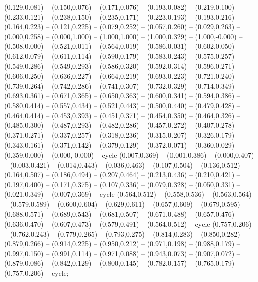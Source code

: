{			(0.129,0.081) -- (0.150,0.076) -- (0.171,0.076) -- (0.193,0.082) --
			(0.219,0.100) -- (0.233,0.121) -- (0.238,0.150) -- (0.235,0.171) --
			(0.223,0.193) -- (0.193,0.216) -- (0.164,0.223) -- (0.121,0.225) --
			(0.079,0.252) -- (0.057,0.260) -- (0.029,0.263) -- (0.000,0.258) --
			(0.000,1.000) -- (1.000,1.000) -- (1.000,0.329) -- (1.000,-0.000) --
			(0.508,0.000) -- (0.521,0.011) -- (0.564,0.019) -- (0.586,0.031) --
			(0.602,0.050) -- (0.612,0.079) -- (0.611,0.114) -- (0.590,0.179) --
			(0.583,0.243) -- (0.575,0.257) -- (0.549,0.286) -- (0.549,0.293) --
			(0.586,0.320) -- (0.592,0.314) -- (0.596,0.271) -- (0.606,0.250) --
			(0.636,0.227) -- (0.664,0.219) -- (0.693,0.223) -- (0.721,0.240) --
			(0.739,0.264) -- (0.742,0.286) -- (0.741,0.307) -- (0.732,0.329) --
			(0.714,0.349) -- (0.693,0.361) -- (0.671,0.365) -- (0.650,0.363) --
			(0.600,0.341) -- (0.594,0.386) -- (0.580,0.414) -- (0.557,0.434) --
			(0.521,0.443) -- (0.500,0.440) -- (0.479,0.428) -- (0.464,0.414) --
			(0.453,0.393) -- (0.451,0.371) -- (0.454,0.350) -- (0.464,0.326) --
			(0.485,0.300) -- (0.487,0.293) -- (0.482,0.286) -- (0.457,0.272) --
			(0.407,0.278) -- (0.371,0.271) -- (0.337,0.257) -- (0.318,0.236) --
			(0.315,0.207) -- (0.326,0.179) -- (0.343,0.161) -- (0.371,0.142) --
			(0.379,0.129) -- (0.372,0.071) -- (0.360,0.029) -- (0.359,0.000) --
			(0.000,-0.000) -- cycle
		(0.007,0.369) -- (0.001,0.386) -- (0.000,0.407) -- (0.003,0.421) --
			(0.014,0.443) -- (0.036,0.463) -- (0.107,0.504) -- (0.136,0.512) --
			(0.164,0.507) -- (0.186,0.494) -- (0.207,0.464) -- (0.213,0.436) --
			(0.210,0.421) -- (0.197,0.400) -- (0.171,0.375) -- (0.107,0.336) --
			(0.079,0.328) -- (0.050,0.331) -- (0.021,0.349) -- (0.007,0.369) -- cycle
		(0.564,0.512) -- (0.558,0.536) -- (0.563,0.564) -- (0.579,0.589) --
			(0.600,0.604) -- (0.629,0.611) -- (0.657,0.609) -- (0.679,0.595) --
			(0.688,0.571) -- (0.689,0.543) -- (0.681,0.507) -- (0.671,0.488) --
			(0.657,0.476) -- (0.636,0.470) -- (0.607,0.473) -- (0.579,0.491) --
			(0.564,0.512) -- cycle
		(0.757,0.206) -- (0.762,0.243) -- (0.779,0.265) -- (0.793,0.275) --
			(0.814,0.283) -- (0.850,0.282) -- (0.879,0.266) -- (0.914,0.225) --
			(0.950,0.212) -- (0.971,0.198) -- (0.988,0.179) -- (0.997,0.150) --
			(0.991,0.114) -- (0.971,0.088) -- (0.943,0.073) -- (0.907,0.072) --
			(0.879,0.086) -- (0.842,0.129) -- (0.800,0.145) -- (0.782,0.157) --
			(0.765,0.179) -- (0.757,0.206) -- cycle;}
\newcommand{\ksvmGaussCSV}{%
	\foreach \p in {(0.304,0.989), (0.743,0.840), (0.378,0.779), (0.856,0.751), (0.206,0.704), (0.309,0.695), (0.370,0.684), (0.431,0.708), (0.937,0.706), (0.111,0.654), (0.526,0.686), (0.570,0.695), (0.609,0.695), (0.183,0.600), (0.491,0.625), (0.263,0.515), (0.311,0.528), (0.752,0.526), (0.985,0.541), (0.937,0.405), (0.267,0.355), (0.356,0.329), (0.630,0.543), (0.146,0.442), (0.072,0.400), (0.522,0.370), (0.669,0.292), (0.387,0.219), (0.513,0.214), (0.830,0.212), (0.011,0.188), (0.052,0.188), (0.148,0.149), (0.172,0.149), (0.924,0.143), (0.530,0.130), (0.461,0.108), (0.446,0.093), (0.543,0.084), (0.431,0.011)}{\node[svboxsm] at \p {};}}


